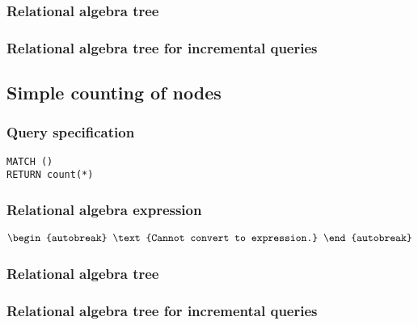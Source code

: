 \subsubsection*{Relational algebra tree}


\subsubsection*{Relational algebra tree for incremental queries}


\subsection{Simple counting of nodes}

\subsubsection*{Query specification}

\begin{lstlisting}
MATCH ()
RETURN count(*)
\end{lstlisting}

\subsubsection*{Relational algebra expression}

\begin{align*}
\begin{autobreak}
\text{Cannot convert to expression.}
\end{autobreak}
\end{align*}

\subsubsection*{Relational algebra tree}


\subsubsection*{Relational algebra tree for incremental queries}


